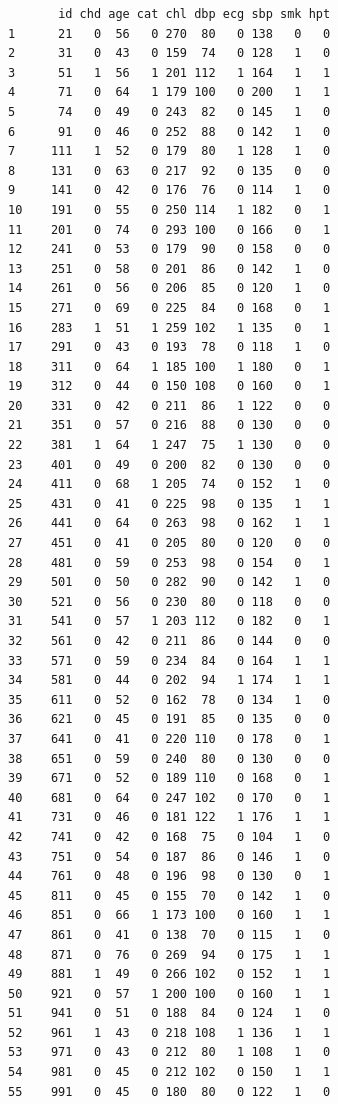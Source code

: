 \documentclass[
  letterpaper,
]{scrbook}
\begin{document}
\begin{verbatim}
       id chd age cat chl dbp ecg sbp smk hpt
1      21   0  56   0 270  80   0 138   0   0
2      31   0  43   0 159  74   0 128   1   0
3      51   1  56   1 201 112   1 164   1   1
4      71   0  64   1 179 100   0 200   1   1
5      74   0  49   0 243  82   0 145   1   0
6      91   0  46   0 252  88   0 142   1   0
7     111   1  52   0 179  80   1 128   1   0
8     131   0  63   0 217  92   0 135   0   0
9     141   0  42   0 176  76   0 114   1   0
10    191   0  55   0 250 114   1 182   0   1
11    201   0  74   0 293 100   0 166   0   1
12    241   0  53   0 179  90   0 158   0   0
13    251   0  58   0 201  86   0 142   1   0
14    261   0  56   0 206  85   0 120   1   0
15    271   0  69   0 225  84   0 168   0   1
16    283   1  51   1 259 102   1 135   0   1
17    291   0  43   0 193  78   0 118   1   0
18    311   0  64   1 185 100   1 180   0   1
19    312   0  44   0 150 108   0 160   0   1
20    331   0  42   0 211  86   1 122   0   0
21    351   0  57   0 216  88   0 130   0   0
22    381   1  64   1 247  75   1 130   0   0
23    401   0  49   0 200  82   0 130   0   0
24    411   0  68   1 205  74   0 152   1   0
25    431   0  41   0 225  98   0 135   1   1
26    441   0  64   0 263  98   0 162   1   1
27    451   0  41   0 205  80   0 120   0   0
28    481   0  59   0 253  98   0 154   0   1
29    501   0  50   0 282  90   0 142   1   0
30    521   0  56   0 230  80   0 118   0   0
31    541   0  57   1 203 112   0 182   0   1
32    561   0  42   0 211  86   0 144   0   0
33    571   0  59   0 234  84   0 164   1   1
34    581   0  44   0 202  94   1 174   1   1
35    611   0  52   0 162  78   0 134   1   0
36    621   0  45   0 191  85   0 135   0   0
37    641   0  41   0 220 110   0 178   0   1
38    651   0  59   0 240  80   0 130   0   0
39    671   0  52   0 189 110   0 168   0   1
40    681   0  64   0 247 102   0 170   0   1
41    731   0  46   0 181 122   1 176   1   1
42    741   0  42   0 168  75   0 104   1   0
43    751   0  54   0 187  86   0 146   1   0
44    761   0  48   0 196  98   0 130   0   1
45    811   0  45   0 155  70   0 142   1   0
46    851   0  66   1 173 100   0 160   1   1
47    861   0  41   0 138  70   0 115   1   0
48    871   0  76   0 269  94   0 175   1   1
49    881   1  49   0 266 102   0 152   1   1
50    921   0  57   1 200 100   0 160   1   1
51    941   0  51   0 188  84   0 124   1   0
52    961   1  43   0 218 108   1 136   1   1
53    971   0  43   0 212  80   1 108   1   0
54    981   0  45   0 212 102   0 150   1   1
55    991   0  45   0 180  80   0 122   1   0

\end{verbatim}
\end{document}

